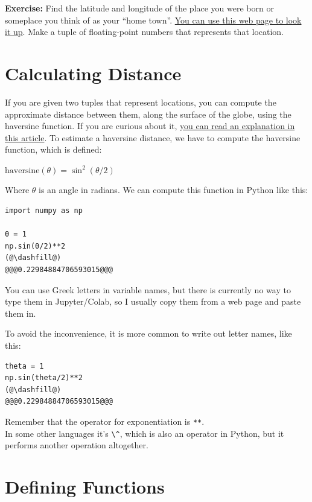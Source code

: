 \textbf{Exercise:} Find the latitude and longitude of the place you were
born or someplace you think of as your ``home town''.
\href{https://www.latlong.net/}{You can use this web page to look it
up}. Make a tuple of floating-point numbers that represents that
location.

\hypertarget{calculating-distance}{%
\section{Calculating Distance}\label{calculating-distance}}

If you are given two tuples that represent locations, you can compute
the approximate distance between them, along the surface of the globe,
using the haversine function. If you are curious about it,
\href{https://janakiev.com/blog/gps-points-distance-python/}{you can
read an explanation in this article}. To estimate a haversine distance,
we have to compute the haversine function, which is defined:

\(\mathrm{haversine}(\theta)=\sin^2(\theta/2)\)

Where \(\theta\) is an angle in radians. We can compute this function in
Python like this:

\begin{lstlisting}[]
import numpy as np

θ = 1
np.sin(θ/2)**2
(@\dashfill@)
@@@0.22984884706593015@@@
\end{lstlisting}

You can use Greek letters in variable names, but there is currently no
way to type them in Jupyter/Colab, so I usually copy them from a web
page and paste them in.

To avoid the inconvenience, it is more common to write out letter names,
like this:

\begin{lstlisting}[]
theta = 1
np.sin(theta/2)**2
(@\dashfill@)
@@@0.22984884706593015@@@
\end{lstlisting}

Remember that the operator for exponentiation is
\passthrough{\lstinline!**!}.\\
In some other languages it's \passthrough{\lstinline!\^!}, which is also
an operator in Python, but it performs another operation altogether.

\hypertarget{defining-functions}{%
\section{Defining Functions}\label{defining-functions}}

